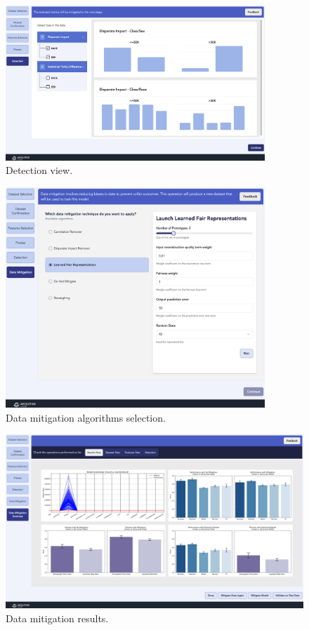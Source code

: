 \documentclass[12pt,a4paper,openright,twoside]{book}
\begin{document}
\begin{figure}
    \centering
    \includegraphics[width=0.87\textwidth]{figures/gui/detection.png}
    \caption{Detection view.}
    \label{fig:detection}
\end{figure}

\begin{figure}
    \centering
    \includegraphics[width=0.87\textwidth]{figures/gui/mitigation-algorithms.png}
    \caption{Data mitigation algorithms selection.}
    \label{fig:mitigation-algorithms}
\end{figure}

\begin{figure}
    \centering
    \includegraphics[width=\textwidth]{figures/gui/mitigation-results.png}
    \caption{Data mitigation results.}
    \label{fig:mitigation-results}
\end{figure}
\end{document}
